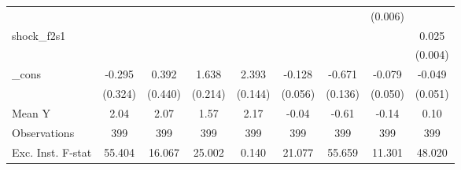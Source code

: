 {\begin{tabular}{l*{8}{c}}
            &                     &                     &                     &                     &                     &                     &     (0.006)         &                     \\
\addlinespace
shock\_f2s1  &                     &                     &                     &                     &                     &                     &                     &       0.025\sym{***}\\
            &                     &                     &                     &                     &                     &                     &                     &     (0.004)         \\
\addlinespace
\_cons      &      -0.295         &       0.392         &       1.638\sym{***}&       2.393\sym{***}&      -0.128\sym{**} &      -0.671\sym{***}&      -0.079         &      -0.049         \\
            &     (0.324)         &     (0.440)         &     (0.214)         &     (0.144)         &     (0.056)         &     (0.136)         &     (0.050)         &     (0.051)         \\
\midrule
Mean Y      &        2.04         &        2.07         &        1.57         &        2.17         &       -0.04         &       -0.61         &       -0.14         &        0.10         \\
Observations&         399         &         399         &         399         &         399         &         399         &         399         &         399         &         399         \\
Exc. Inst. F-stat&      55.404         &      16.067         &      25.002         &       0.140         &      21.077         &      55.659         &      11.301         &      48.020         \\
\bottomrule
\end{tabular}
}
